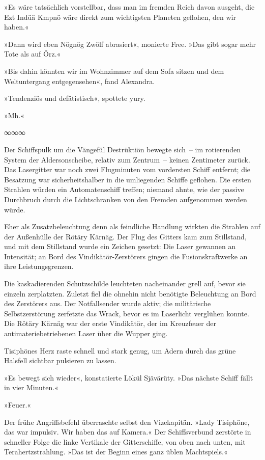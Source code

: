 »Es wäre tatsächlich vorstellbar, dass man im fremden Reich davon ausgeht, die Ezt Indüä Kmpnö wäre direkt zum wichtigsten Planeten geflohen, den wir haben.«

»Dann wird eben Nögnög Zwölf abrasiert«, monierte Free. »Das gibt sogar mehr Tote als auf Örz.«

»Bis dahin könnten wir im Wohnzimmer auf dem Sofa sitzen und dem Weltuntergang entgegensehen«, fand Alexandra.

»Tendenziös und defätistisch«, spottete yury.

»Mh.«

\begin{center}
∞∞∞
\end{center}

Der Schiffspulk um die Vängefül Destrüktiön bewegte sich~– im rotierenden System der Aldersonscheibe, relativ zum Zentrum~– keinen Zentimeter zurück. Das Lasergitter war noch zwei Flugminuten vom vordersten Schiff entfernt; die Besatzung war sicherheitshalber in die umliegenden Schiffe geflohen. Die ersten Strahlen würden ein Automatenschiff treffen; niemand ahnte, wie der passive Durchbruch durch die Lichtschranken von den Fremden aufgenommen werden würde.

Eher als Zusatzbeleuchtung denn als feindliche Handlung wirkten die Strahlen auf der Außenhülle der Rötäry Kärnäg. Der Flug des Gitters kam zum Stillstand, und mit dem Stillstand wurde ein Zeichen gesetzt: Die Laser gewannen an Intensität; an Bord des Vindikätör-Zerstörers gingen die Fusionskraftwerke an ihre Leistungsgrenzen.

Die kaskadierenden Schutzschilde leuchteten nacheinander grell auf, bevor sie einzeln zerplatzten. Zuletzt fiel die ohnehin nicht benötigte Beleuchtung an Bord des Zerstörers aus. Der Notfallsender wurde aktiv; die militärische Selbstzerstörung zerfetzte das Wrack, bevor es im Laserlicht verglühen konnte. Die Rötäry Kärnäg war der erste Vindikätör, der im Kreuzfeuer der antimateriebetriebenen Laser über die Wupper ging.

Tisiphönes Herz raste schnell und stark genug, um Adern durch das grüne Halsfell sichtbar pulsieren zu lassen.

»Es bewegt sich wieder«, konstatierte Lökül Sjävärüty. »Das nächste Schiff fällt in vier Minuten.«

»Feuer.«

Der frühe Angriffsbefehl überraschte selbst den Vizekapitän. »Lady Tisiphöne, das war impulsiv. Wir haben das auf Kamera.« Der Schiffsverbund zerstörte in schneller Folge die linke Vertikale der Gitterschiffe, von oben nach unten, mit Terahertzstrahlung. »Das ist der Beginn eines ganz üblen Machtspiels.«

